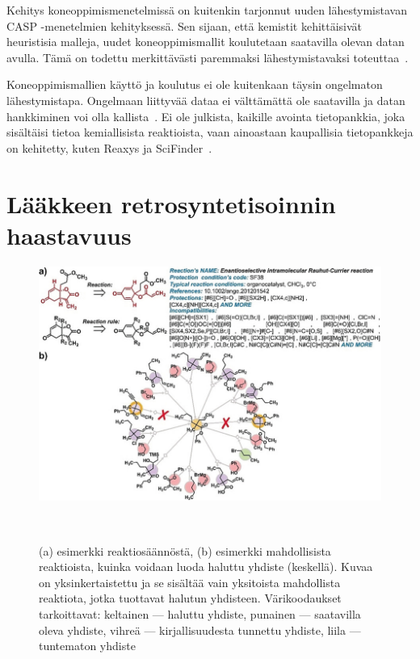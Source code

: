 \documentclass[finnish,twoside,censored,tkt,sw-line]{HYthesisML}
\begin{document}
Kehitys koneoppimismenetelmissä on kuitenkin tarjonnut uuden lähestymistavan CASP -menetelmien kehityksessä.
Sen sijaan, että kemistit kehittäisivät heuristisia malleja, uudet koneoppimismallit koulutetaan saatavilla olevan datan avulla.
Tämä on todettu merkittävästi paremmaksi lähestymistavaksi toteuttaa~\cite{ColeyConnorW2018MLiC}.

Koneoppimismallien käyttö ja koulutus ei ole kuitenkaan täysin ongelmaton lähestymistapa.
Ongelmaan liittyvää dataa ei välttämättä ole saatavilla ja datan hankkiminen voi olla kallista~\cite{deAlmeidaA.Filipa2019Socd}.
Ei ole julkista, kaikille avointa tietopankkia, joka sisältäisi tietoa kemiallisista reaktioista, vaan ainoastaan kaupallisia tietopankkeja on kehitetty, kuten Reaxys ja SciFinder~\cite{deAlmeidaA.Filipa2019Socd}.

\section{Lääkkeen retrosyntetisoinnin haastavuus}

\begin{figure}[!ht]
    \centering
    \includegraphics[width=\textwidth]{retrosynthesis.jpg}
    \caption{(a) esimerkki reaktiosäännöstä, (b) esimerkki mahdollisista reaktioista, kuinka voidaan luoda haluttu yhdiste (keskellä).
        Kuvaa on yksinkertaistettu ja se sisältää vain yksitoista mahdollista reaktiota, jotka tuottavat halutun yhdisteen.
        Värikoodaukset tarkoittavat: keltainen --- haluttu yhdiste, punainen --- saatavilla oleva yhdiste, vihreä --- kirjallisuudesta tunnettu yhdiste, liila --- tuntematon yhdiste}
    {~\cite{ExpertKnowledgeRetorsynthesis}}
    \label{fig:retrosynthesis-example}
\end{figure}
\end{document}
